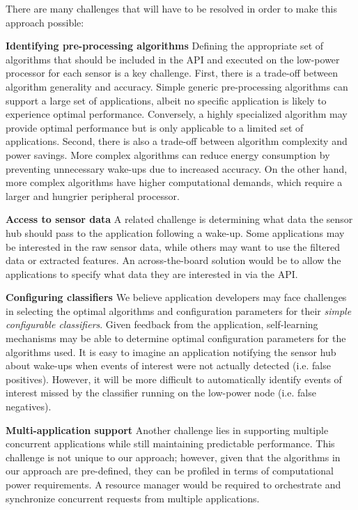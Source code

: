 There are many challenges that will have to be resolved in order to
make this approach possible:

{\bf Identifying pre-processing algorithms} Defining the appropriate
set of algorithms that should be included in the API and executed on
the low-power processor for each sensor is a key challenge. First,
there is a trade-off between algorithm generality and accuracy.
Simple generic pre-processing algorithms can support a large set of
applications, albeit no specific application is likely to experience
optimal performance.  Conversely, a highly specialized algorithm may
provide optimal performance but is only applicable to a limited set of
applications.  Second, there is also a trade-off between algorithm
complexity and power savings.  More complex algorithms can reduce
energy consumption by preventing unnecessary wake-ups due to increased
accuracy. On the other hand, more complex algorithms have higher
computational demands, which require a larger and hungrier peripheral
processor.

{\bf Access to sensor data} A related challenge is determining what
data the sensor hub should pass to the application following a
wake-up. Some applications may be interested in the raw sensor data,
while others may want to use the filtered data or extracted features.
An across-the-board solution would be to allow the applications to
specify what data they are interested in via the API.

{\bf Configuring classifiers} We believe application developers may
face challenges in selecting the optimal algorithms and configuration
parameters for their {\em simple configurable classifiers}. Given feedback from the
application, self-learning mechanisms may be able to determine optimal
configuration parameters for the algorithms used.  It is easy to 
imagine an application notifying the
sensor hub about wake-ups when events of interest were not actually
detected (i.e.  false positives).  However, it will be more difficult
to automatically identify events of interest missed by the classifier
running on the low-power node (i.e. false negatives).

{\bf Multi-application support} Another challenge lies in supporting
multiple concurrent applications while still maintaining predictable
performance.  This challenge is not unique to our approach; however,
given that the algorithms in our approach are pre-defined, they can be
profiled in terms of computational power requirements. A resource
manager would be required to orchestrate and synchronize concurrent
requests from multiple applications.

